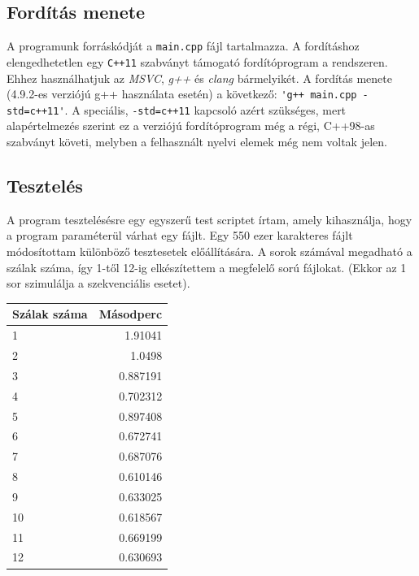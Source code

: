 \documentclass[12pt]{article}
\begin{document}
\subsection{Fordítás menete}

A programunk forráskódját a \verb|main.cpp| fájl tartalmazza. A fordításhoz elengedhetetlen egy \verb|C++11| szabványt támogató fordítóprogram a rendszeren. Ehhez használhatjuk az \textit{MSVC}, \textit{g++} és \textit{clang} bármelyikét. A fordítás menete (4.9.2-es verziójú g++ használata esetén) a következő: \verb|'g++ main.cpp -std=c++11'|. A speciális, \verb|-std=c++11| kapcsoló azért szükséges, mert alapértelmezés szerint ez a verziójú fordítóprogram még a régi, C++98-as szabványt követi, melyben a felhasznált nyelvi elemek még nem voltak jelen.


\subsection{Tesztelés}

A program tesztelésésre egy egyszerű test scriptet írtam, amely kihasználja, hogy a program paraméterül várhat egy fájlt. Egy 550 ezer karakteres fájlt módosítottam különböző tesztesetek előállítására. A sorok számával megadható a szálak száma, így 1-től 12-ig elkészítettem a megfelelő sorú fájlokat. (Ekkor az 1 sor szimulálja a szekvenciális esetet).

\begin{tabular}{ l r }
	Szálak száma & Másodperc \\ \hline
	1  &  1.91041  \\
	2  &  1.0498  \\
	3  &  0.887191  \\
	4  &  0.702312  \\
	5  &  0.897408  \\
	6  &  0.672741  \\
	7  &  0.687076  \\
	8  &  0.610146  \\
	9  &  0.633025  \\
	10 &  0.618567  \\
	11 &  0.669199  \\
	12 &  0.630693  \\
\end{tabular}
\end{document}
